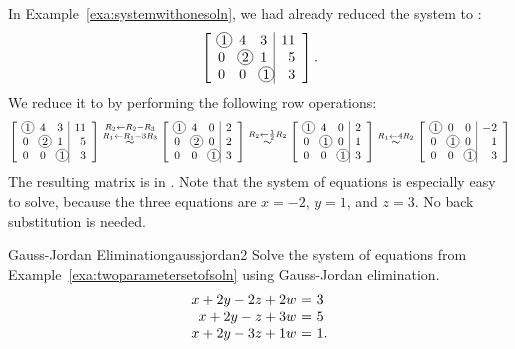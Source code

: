 \begin{solution}
  In Example~\ref{exa:systemwithonesoln}, we had already reduced the
  system to {\ef}:
  \begin{equation*}
    \leftB
    \begin{array}{rrr|r}
      \circled{1} & 4 & 3 & 11 \\
      0 & \circled{2} & 1 & 5 \\
      0 & 0 & \circled{1} & 3
    \end{array}
    \rightB.
  \end{equation*}
  We reduce it to {\rref} by performing the following row operations:
  \begin{equation*}
    \leftB
    \begin{array}{rrr|r}
      \circled{1} & 4 & 3 & 11 \\
      0 & \circled{2} & 1 & 5 \\
      0 & 0 & \circled{1} & 3
    \end{array}
    \rightB
    \stackrel{R_2\leftarrow R_2-R_3}{\stackrel{R_1\leftarrow R_1-3R_3}{\sim}}
    \leftB
    \begin{array}{rrr|r}
      \circled{1} & 4 & 0 & 2 \\
      0 & \circled{2} & 0 & 2 \\
      0 & 0 & \circled{1} & 3
    \end{array}
    \rightB
    \stackrel{R_2\leftarrow \frac{1}{2}R_2}{\sim}
    \leftB
    \begin{array}{rrr|r}
      \circled{1} & 4 & 0 & 2 \\
      0 & \circled{1} & 0 & 1 \\
      0 & 0 & \circled{1} & 3
    \end{array}
    \rightB
    \stackrel{R_1\leftarrow 4R_2}{\sim}
    \leftB
    \begin{array}{rrr|r}
      \circled{1} & 0 & 0 & -2 \\
      0 & \circled{1} & 0 & 1 \\
      0 & 0 & \circled{1} & 3
    \end{array}
    \rightB
  \end{equation*}
  The resulting matrix is in {\rref}. Note that the system of
  equations is especially easy to solve, because the three equations
  are $x=-2$, $y=1$, and $z=3$. No back substitution is needed.
\end{solution}

\begin{example}{Gauss-Jordan Elimination}{gaussjordan2}
  Solve the system of equations from
  Example~\ref{exa:twoparametersetofsoln} using Gauss-Jordan
  elimination.
  \begin{equation*}
    \begin{array}{r@{~}c@{~}l}
      x +2y  -2z  +2w &=& 3 \\
      x +2y  -z   +3w &=& 5 \\
      x +2y  -3z  +1w &=& 1.
    \end{array}
  \end{equation*}    
\end{example}

